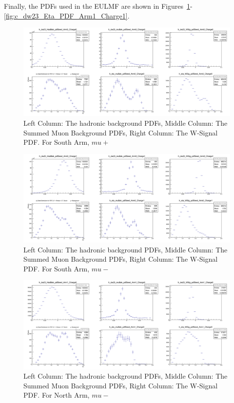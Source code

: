 Finally, the PDFs used in the EULMF are shown in
Figures~\ref{fig:c_dw23_Eta_PDF_Arm0_Charge0}-\ref{fig:c_dw23_Eta_PDF_Arm1_Charge1}.

\begin{figure}
  \centering
  \includegraphics[width=\linewidth]{././figures/c_dw23_Eta_PDF_Arm0_Charge0.png}
  \caption{
    Left Column: The hadronic background PDFs, Middle Column: The Summed Muon
    Background PDFs, Right Column: The W-Signal PDF. For South Arm, $mu+$
  }
  \label{fig:c_dw23_Eta_PDF_Arm0_Charge0}
\end{figure}

\begin{figure}
  \centering
  \includegraphics[width=\linewidth]{././figures/c_dw23_Eta_PDF_Arm0_Charge1.png}
  \caption{
    Left Column: The hadronic background PDFs, Middle Column: The Summed Muon
    Background PDFs, Right Column: The W-Signal PDF. For South Arm, $mu-$
  }
  \label{fig:c_dw23_Eta_PDF_Arm0_Charge1}
\end{figure}

\begin{figure}
  \centering
  \includegraphics[width=\linewidth]{././figures/c_dw23_Eta_PDF_Arm1_Charge0.png}
  \caption{
    Left Column: The hadronic background PDFs, Middle Column: The Summed Muon
    Background PDFs, Right Column: The W-Signal PDF. For North Arm, $mu-$
  }
  \label{fig:c_dw23_Eta_PDF_Arm1_Charge0}
\end{figure}

